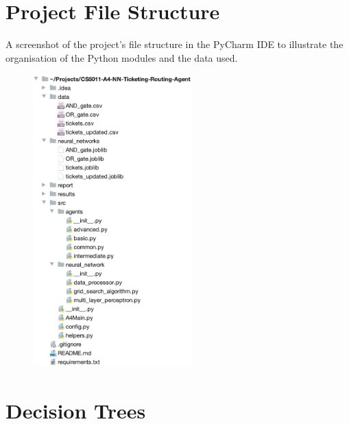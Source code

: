 \documentclass[letterpaper,12pt]{article}
\begin{document}
\begin{appendices}

\clearpage




\clearpage
\section{Project File Structure}
\label{sec:appendix-project-file-structure}

A screenshot of the project’s file structure in the PyCharm IDE to illustrate the organisation of the Python modules and the data used.

\begin{figure}[h] 
\centerline{\includegraphics[width=0.55\textwidth]{report/figures/project_structure.png}}
\label{fig:project_structure}
\end{figure}


\clearpage
\section{Decision Trees}
\label{sec:appendix-decision-trees}


\end{appendices}
\end{document}
